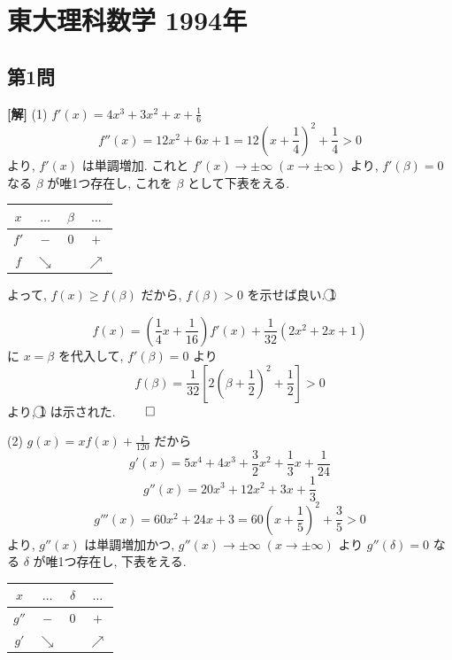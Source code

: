 \documentclass[../main.tex]{subfiles}
\begin{document}
\section*{東大理科数学 1994年}

\subsection*{第1問}

\noindent
\textbf{[解]} (1) $f'(x) = 4x^3 + 3x^2 + x + \frac{1}{6}$
\[
  f''(x) = 12x^2 + 6x + 1 = 12\left(x + \frac{1}{4}\right)^2 + \frac{1}{4} > 0
\]
より, $f'(x)$ は単調増加. これと $f'(x) \to \pm\infty \; (x \to \pm\infty)$ より, $f'(\beta) = 0$ なる $\beta$ が唯1つ存在し, これを $\beta$ として下表をえる.

\begin{center}
  \begin{tabular}{c|c|c|c}
    $x$ & $\dots$ & $\beta$ & $\dots$ \\ \hline
    $f'$ & $-$ & 0 & $+$ \\ \hline
    $f$ & $\searrow$ & & $\nearrow$
  \end{tabular}
\end{center}

よって, $f(x) \ge f(\beta)$ だから, $f(\beta) > 0$ を示せば良い. \hfill \textcircled{1}

\[
  f(x) = \left( \frac{1}{4}x + \frac{1}{16} \right) f'(x) + \frac{1}{32}(2x^2 + 2x + 1)
\]
に $x = \beta$ を代入して, $f'(\beta) = 0$ より
\[
  f(\beta) = \frac{1}{32} \left[ 2\left(\beta + \frac{1}{2}\right)^2 + \frac{1}{2} \right] > 0
\]
より, \textcircled{1} は示された. \hfill $\qed$

\bigskip

\noindent
(2) $g(x) = x f(x) + \frac{1}{120}$ だから
\[
  g'(x) = 5x^4 + 4x^3 + \frac{3}{2}x^2 + \frac{1}{3}x + \frac{1}{24}
\]
\[
  g''(x) = 20x^3 + 12x^2 + 3x + \frac{1}{3}
\]
\[
  g'''(x) = 60x^2 + 24x + 3 = 60\left(x + \frac{1}{5}\right)^2 + \frac{3}{5} > 0
\]
より, $g''(x)$ は単調増加かつ, $g''(x) \to \pm\infty \; (x \to \pm\infty)$ より $g''(\delta) = 0$ なる $\delta$ が唯1つ存在し, 下表をえる.

\begin{center}
  \begin{tabular}{c|c|c|c}
    $x$ & $\dots$ & $\delta$ & $\dots$ \\ \hline
    $g''$ & $-$ & 0 & $+$ \\ \hline
    $g'$ & $\searrow$ & & $\nearrow$
  \end{tabular}
\end{center}
\end{document}
